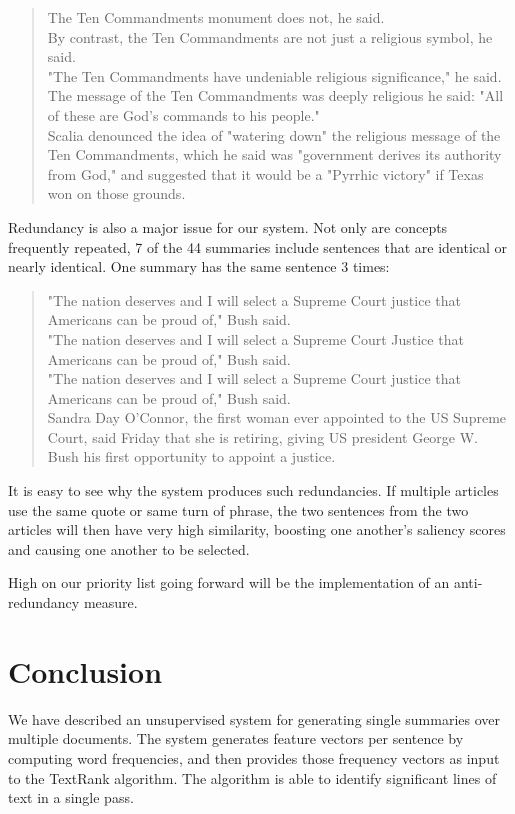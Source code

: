 \documentclass[11pt]{article}
\begin{document}
	\begin{quote}
		The Ten Commandments monument does not, he said.\\
		By contrast, the Ten Commandments are not just a religious symbol, he said.\\
		"The Ten Commandments have undeniable religious significance," he said.\\
		The message of the Ten Commandments was deeply religious he said: "All of these are God's commands to his people."\\
		Scalia denounced the idea of "watering down" the religious message of the Ten Commandments, which he said was "government derives its authority from God," and suggested that it would be a "Pyrrhic victory" if Texas won on those grounds.
	\end{quote}
	
	Redundancy is also a major issue for our system. Not only are concepts frequently repeated, 7 of the 44 summaries include sentences that are identical or nearly identical. One summary has the same sentence 3 times:\\
	
	\begin{quote}
		"The nation deserves and I will select a Supreme Court justice that Americans can be proud of," Bush said.\\
		"The nation deserves and I will select a Supreme Court Justice that Americans can be proud of," Bush said.\\
		"The nation deserves and I will select a Supreme Court justice that Americans can be proud of," Bush said.\\
		Sandra Day O'Connor, the first  woman ever appointed to the US Supreme Court, said Friday that she is retiring, giving US president George W. Bush his first  opportunity to appoint a justice.
	\end{quote}
	
	It is easy to see why the system produces such redundancies. If multiple articles use the same quote or same turn of phrase, the two sentences from the two articles will then have very high similarity, boosting one another's saliency scores and causing one another to be selected.
	
	High on our priority list going forward will be the implementation of an anti-redundancy measure.
	
	
	\section{Conclusion}
	We have described an unsupervised system for generating single summaries over multiple documents. The system generates feature vectors per sentence by computing word frequencies, and then provides those frequency vectors as input to the TextRank algorithm. The algorithm is able to identify significant lines of text in a single pass. 
	
\end{document}
